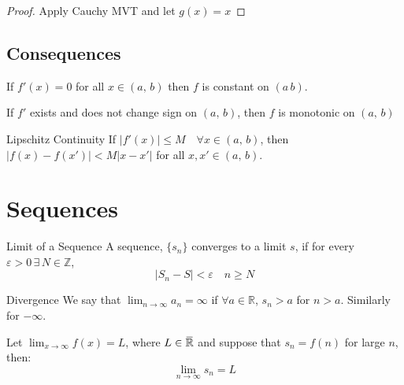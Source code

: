 \documentclass{article}
\newcommand{\R}{\mathbb{R}}
\newcommand{\Z}{\mathbb{Z}}
\newcommand{\e}{\varepsilon}
\newcommand{\ex}{\exists\,}
\newcommand{\overbar}[1]{\mkern 1.5mu\overline{\mkern-1.5mu#1\mkern-1.5mu}\mkern 1.5mu}
\newcommand{\eR}{\overbar{\R}}
\begin{document}
{{{{\begin{figure}[H]
\end{figure}
\begin{proof}
  Apply Cauchy MVT and let $g(x) = x$
\end{proof}
\subsection{Consequences}
\noindent\begin{theorem}{}{}
 If $f'(x) = 0$ for all $x\in (a,\,b)$ then $f$ is constant on $(a\,b)$.
\end{theorem}\vspace{10pt}
\noindent\begin{theorem}{}{}
 If $f'$ exists and does not change sign on $(a,\,b)$, then $f$ is monotonic on $(a,\,b)$
\end{theorem}\vspace{10pt}
\noindent\begin{theorem}{Lipschitz Continuity}{}
 If $|f'(x)|\le M \quad\forall x\in(a,\,b)$, then $|f(x) - f(x')| < M|x - x'|$ for all $x, x' \in (a,\,b)$.
\end{theorem}\vspace{10pt}


\section{Sequences}

\noindent\begin{definition}{Limit of a Sequence}{}
  A sequence, $\{s_n \}$ converges to a limit $s$, if for every $\e > 0\, \ex N\in \Z$,
  $$ |S_n - S|< \e \quad n \ge N $$
\end{definition}\vspace{10pt}

\noindent\begin{definition}{Divergence}{}
  We say that $\displaystyle{\lim_{n\to\infty}{a_n} = \infty}$ if $\forall a \in \R$, $s_n > a$ for $n > a$. Similarly for $-\infty$.
\end{definition}\vspace{10pt}

\noindent\begin{theorem}{}{}
   Let $\displaystyle{\lim_{x\to \infty}{f(x)} = L}$, where $L\in \eR$ and suppose that $s_n = f(n)$ for large $n$, then:
   $$ \lim_{n\to\infty}{s_n} = L $$
\end{theorem}\vspace{10pt}

}}}}
\end{document}
